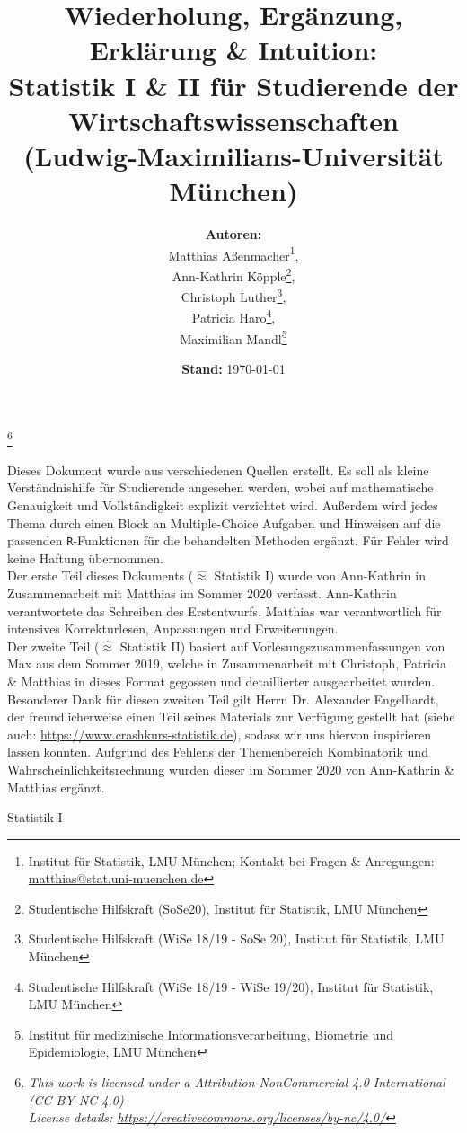 \documentclass[a4paper]{article}
\title{%
  \large Wiederholung, Ergänzung, Erklärung \& Intuition:\\
  \Large Statistik I \& II für Studierende der Wirtschaftswissenschaften\\
  \large (Ludwig-Maximilians-Universität München)
}
\date{\textbf{Stand:} \today}
\author{\textbf{Autoren:}\\ 
Matthias Aßenmacher\thanks{Institut für Statistik, LMU München; Kontakt bei Fragen \& Anregungen: \url{matthias@stat.uni-muenchen.de}},\\
Ann-Kathrin Köpple\thanks{Studentische Hilfskraft (SoSe20), Institut für Statistik, LMU München},\\
Christoph Luther\thanks{Studentische Hilfskraft (WiSe 18/19 - SoSe 20), Institut für Statistik, LMU München},\\
Patricia Haro\thanks{Studentische Hilfskraft (WiSe 18/19 - WiSe 19/20), Institut für Statistik, LMU München},\\
Maximilian Mandl\thanks{Institut für medizinische Informationsverarbeitung, Biometrie und Epidemiologie, LMU München\vspace{.25cm}}}
\newcommand\blfootnote[1]{%
  \begingroup
  \renewcommand\thefootnote{}\footnote{#1}%
  \addtocounter{footnote}{-1}%
  \endgroup
}
\begin{document}
\maketitle

\blfootnote{
\hspace{-0.75cm} 
\textit{\small 
This work is licensed under a Attribution-NonCommercial 4.0 International (CC BY-NC 4.0)\\          
License details: \url{https://creativecommons.org/licenses/by-nc/4.0/}}
}

\noindent Dieses  Dokument wurde aus verschiedenen Quellen erstellt. Es soll als kleine Verständnishilfe für Studierende angesehen werden, wobei auf mathematische Genauigkeit und Vollständigkeit explizit verzichtet wird. Außerdem wird jedes Thema durch einen Block an Multiple-Choice Aufgaben und Hinweisen auf die passenden \texttt{R}-Funktionen für die behandelten Methoden ergänzt. Für Fehler wird keine Haftung übernommen.\\

\noindent Der erste Teil dieses Dokuments ($\widehat \approx$ Statistik I) wurde von Ann-Kathrin in Zusammenarbeit mit Matthias im Sommer 2020 verfasst. Ann-Kathrin verantwortete das Schreiben des Erstentwurfs, Matthias war verantwortlich für intensives Korrekturlesen, Anpassungen und Erweiterungen.\\
Der zweite Teil ($\widehat \approx$ Statistik II) basiert auf Vorlesungszusammenfassungen von Max aus dem Sommer 2019, welche in Zusammenarbeit mit Christoph, Patricia \& Matthias in dieses Format gegossen und detaillierter ausgearbeitet wurden. Besonderer Dank für diesen zweiten Teil gilt Herrn Dr. Alexander Engelhardt, der freundlicherweise einen Teil seines Materials zur Verfügung gestellt hat (siehe auch: \url{https://www.crashkurs-statistik.de}), sodass wir uns hiervon inspirieren lassen konnten. Aufgrund des Fehlens der Themenbereich Kombinatorik und Wahrscheinlichkeitsrechnung wurden dieser im Sommer 2020 von Ann-Kathrin \& Matthias ergänzt.

\clearpage

\tableofcontents

\clearpage

\hspace{0pt}
\vfill
\begin{center}
    {\Huge Statistik I}
\end{center}
\vfill
\hspace{0pt}

\clearpage
\end{document}

